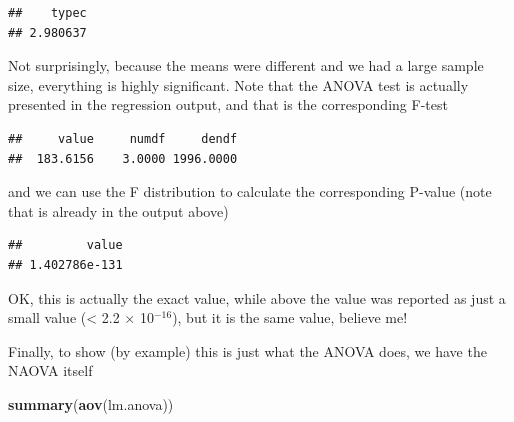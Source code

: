 \documentclass[
]{book}
\newenvironment{Shaded}{\begin{snugshade}}{\end{snugshade}}
\newcommand{\DecValTok}[1]{\textcolor[rgb]{0.00,0.00,0.81}{#1}}
\newcommand{\KeywordTok}[1]{\textcolor[rgb]{0.13,0.29,0.53}{\textbf{#1}}}
\newcommand{\NormalTok}[1]{#1}
\newcommand{\OperatorTok}[1]{\textcolor[rgb]{0.81,0.36,0.00}{\textbf{#1}}}
\begin{document}
\begin{verbatim}
##    typec 
## 2.980637
\end{verbatim}

Not surprisingly, because the means were different and we had a large sample size, everything is highly significant. Note that the ANOVA test is actually presented in the regression output, and that is the corresponding F-test

\begin{Shaded}
\end{Shaded}

\begin{verbatim}
##     value     numdf     dendf 
##  183.6156    3.0000 1996.0000
\end{verbatim}

and we can use the F distribution to calculate the corresponding P-value (note that is already in the output above)

\begin{Shaded}
\end{Shaded}

\begin{verbatim}
##         value 
## 1.402786e-131
\end{verbatim}

OK, this is actually the exact value, while above the value was reported as just a small value (\textless{} 2.2 \(\times\) 10\(^{-16}\)), but it is the same value, believe me!

Finally, to show (by example) this is just what the ANOVA does, we have the NAOVA itself

\begin{Shaded}
\begin{Highlighting}[]
\KeywordTok{summary}\NormalTok{(}\KeywordTok{aov}\NormalTok{(lm.anova))}
\end{Highlighting}
\end{Shaded}
\end{document}
